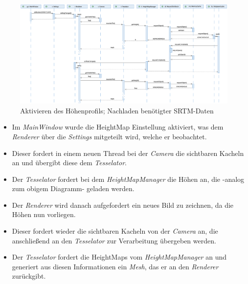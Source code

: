 \documentclass[10pt]{scrreprt}
\begin{document}
\vspace*{5mm}
\begin{figure}[h]
\begin{center}
\includegraphics[scale=0.28]{sequenz-height.eps}
\caption{Aktivieren des Höhenprofils; Nachladen benötigter SRTM-Daten}
\end{center}
\end{figure}

\begin{itemize}
\item Im \textit{MainWindow} wurde die HeightMap Einstellung aktiviert, was dem \textit{Renderer} über die \textit{Settings} mitgeteilt wird, welche er beobachtet.
\item Dieser fordert in einem neuen Thread bei der \textit{Camera} die sichtbaren Kacheln an und übergibt diese dem \textit{Tesselator}.
\item Der \textit{Tesselator} fordert bei dem \textit{HeightMapManager} die Höhen an, die -analog zum obigem Diagramm- geladen werden.
\item Der \textit{Renderer} wird danach aufgefordert ein neues Bild zu zeichnen, da die Höhen nun vorliegen.
\item Dieser fordert wieder die sichtbaren Kacheln von der \textit{Camera} an, die anschließend an den \textit{Tesselator} zur Verarbeitung übergeben werden.
\item Der \textit{Tesselator} fordert die HeightMaps vom \textit{HeightMapManager} an und generiert aus diesen Informationen ein \textit{Mesh}, das er an den \textit{Renderer} zurückgibt.
\end{itemize}
\end{document}
